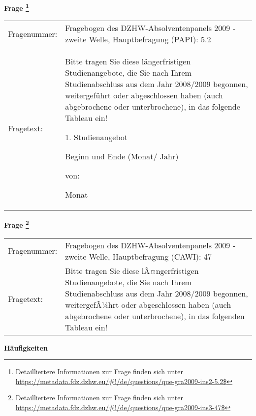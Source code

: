 				\vspace*{0.5cm}
                \noindent\textbf{Frage
	                \footnote{Detailliertere Informationen zur Frage finden sich unter
		              \url{https://metadata.fdz.dzhw.eu/\#!/de/questions/que-gra2009-ins2-5.2$}}}\\
				\begin{tabularx}{\hsize}{@{}lX}
					Fragenummer: &
					  Fragebogen des DZHW-Absolventenpanels 2009 - zweite Welle, Hauptbefragung (PAPI):
					  5.2
 \\
					Fragetext: & Bitte tragen Sie diese längerfristigen Studienangebote, die Sie nach Ihrem Studienabschluss aus dem Jahr 2008/2009 begonnen, weitergeführt oder abgeschlossen haben (auch abgebrochene oder unterbrochene), in das folgende Tableau ein!\par  1. Studienangebot\par  Beginn und Ende (Monat/ Jahr)\par  von:\par  Monat \\
				\end{tabularx}
				\vspace*{0.5cm}
                \noindent\textbf{Frage
	                \footnote{Detailliertere Informationen zur Frage finden sich unter
		              \url{https://metadata.fdz.dzhw.eu/\#!/de/questions/que-gra2009-ins3-47$}}}\\
				\begin{tabularx}{\hsize}{@{}lX}
					Fragenummer: &
					  Fragebogen des DZHW-Absolventenpanels 2009 - zweite Welle, Hauptbefragung (CAWI):
					  47
 \\
					Fragetext: & Bitte tragen Sie diese lÃ¤ngerfristigen Studienangebote, die Sie nach Ihrem Studienabschluss aus dem Jahr 2008/2009 begonnen, weitergefÃ¼hrt oder abgeschlossen haben (auch abgebrochene oder unterbrochene), in das folgenden Tableau ein! \\
				\end{tabularx}





        		\vspace*{0.5cm}
                \noindent\textbf{Häufigkeiten}

